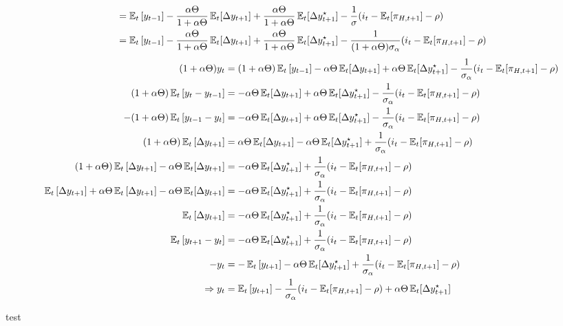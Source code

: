 \documentclass[12pt]{article}
\begin{document}
\begin{landscape}
\begin{align*}
    &= \operatorname{\mathbb{E}}_t\left[y_{t-1}\right] - \frac{\alpha \Theta}{1+\alpha \Theta} \operatorname{\mathbb{E}}_t[\Delta y_{t+1}] + \frac{\alpha \Theta}{1+\alpha \Theta}\operatorname{\mathbb{E}}_t[\Delta y_{t+1}^{\star}] - \frac{1}{\sigma}( i_t  - \operatorname{\mathbb{E}}_t [\pi_{H,t+1}] - \rho  ) \\
    &= \operatorname{\mathbb{E}}_t\left[y_{t-1}\right] - \frac{\alpha \Theta}{1+\alpha \Theta} \operatorname{\mathbb{E}}_t[\Delta y_{t+1}] + \frac{\alpha \Theta}{1+\alpha \Theta}\operatorname{\mathbb{E}}_t[\Delta y_{t+1}^{\star}] - \frac{1}{(1+\alpha \Theta)\sigma_\alpha}( i_t  - \operatorname{\mathbb{E}}_t [\pi_{H,t+1}] - \rho  ) \\
\end{align*}  
\begin{align}  
    (1+\alpha \Theta)y_t&= (1+\alpha \Theta)\operatorname{\mathbb{E}}_t\left[y_{t-1}\right] - \alpha \Theta \operatorname{\mathbb{E}}_t[\Delta y_{t+1}] + \alpha \Theta\operatorname{\mathbb{E}}_t[\Delta y_{t+1}^{\star}] - \frac{1}{\sigma_\alpha}( i_t  - \operatorname{\mathbb{E}}_t [\pi_{H,t+1}] - \rho  ) \nonumber\\
    (1+\alpha \Theta)\operatorname{\mathbb{E}}_t\left[y_t - y_{t-1}\right]&=  - \alpha \Theta \operatorname{\mathbb{E}}_t[\Delta y_{t+1}] + \alpha \Theta\operatorname{\mathbb{E}}_t[\Delta y_{t+1}^{\star}] - \frac{1}{\sigma_\alpha}( i_t  - \operatorname{\mathbb{E}}_t [\pi_{H,t+1}] - \rho  ) \nonumber\\
    -(1+\alpha \Theta)\operatorname{\mathbb{E}}_t\left[y_{t-1} - y_t \right]&=  - \alpha \Theta \operatorname{\mathbb{E}}_t[\Delta y_{t+1}] + \alpha \Theta\operatorname{\mathbb{E}}_t[\Delta y_{t+1}^{\star}] - \frac{1}{\sigma_\alpha}( i_t  - \operatorname{\mathbb{E}}_t [\pi_{H,t+1}] - \rho  ) \nonumber\\
    (1+\alpha \Theta)\operatorname{\mathbb{E}}_t\left[\Delta y_{t+1}\right]&=  \alpha \Theta \operatorname{\mathbb{E}}_t[\Delta y_{t+1}] - \alpha \Theta\operatorname{\mathbb{E}}_t[\Delta y_{t+1}^{\star}] + \frac{1}{\sigma_\alpha}( i_t  - \operatorname{\mathbb{E}}_t [\pi_{H,t+1}] - \rho  ) \nonumber\\
    (1+\alpha \Theta)\operatorname{\mathbb{E}}_t\left[\Delta y_{t+1}\right] - \alpha \Theta \operatorname{\mathbb{E}}_t[\Delta y_{t+1}]&= - \alpha \Theta\operatorname{\mathbb{E}}_t[\Delta y_{t+1}^{\star}] + \frac{1}{\sigma_\alpha}( i_t  - \operatorname{\mathbb{E}}_t [\pi_{H,t+1}] - \rho  ) \nonumber\\
    \operatorname{\mathbb{E}}_t\left[\Delta y_{t+1}\right] +\alpha \Theta\operatorname{\mathbb{E}}_t\left[\Delta y_{t+1}\right] - \alpha \Theta \operatorname{\mathbb{E}}_t[\Delta y_{t+1}]&= - \alpha \Theta\operatorname{\mathbb{E}}_t[\Delta y_{t+1}^{\star}] + \frac{1}{\sigma_\alpha}( i_t  - \operatorname{\mathbb{E}}_t [\pi_{H,t+1}] - \rho  ) \nonumber\\
    \operatorname{\mathbb{E}}_t\left[\Delta y_{t+1}\right] &= - \alpha \Theta\operatorname{\mathbb{E}}_t[\Delta y_{t+1}^{\star}] + \frac{1}{\sigma_\alpha}( i_t  - \operatorname{\mathbb{E}}_t [\pi_{H,t+1}] - \rho  ) \nonumber\\
    \operatorname{\mathbb{E}}_t\left[y_{t+1}-y_t\right] &= - \alpha \Theta\operatorname{\mathbb{E}}_t[\Delta y_{t+1}^{\star}] + \frac{1}{\sigma_\alpha}( i_t  - \operatorname{\mathbb{E}}_t [\pi_{H,t+1}] - \rho  )\nonumber\\
    -y_t &= -\operatorname{\mathbb{E}}_t\left[y_{t+1}\right]- \alpha \Theta\operatorname{\mathbb{E}}_t[\Delta y_{t+1}^{\star}] + \frac{1}{\sigma_\alpha}( i_t  - \operatorname{\mathbb{E}}_t [\pi_{H,t+1}] - \rho  ) \nonumber\\
    \Rightarrow y_t &= \operatorname{\mathbb{E}}_t\left[y_{t+1}\right]- \frac{1}{\sigma_\alpha}( i_t  - \operatorname{\mathbb{E}}_t [\pi_{H,t+1}] - \rho  ) + \alpha \Theta\operatorname{\mathbb{E}}_t[\Delta y_{t+1}^{\star}] \\
\end{align}
\end{landscape}
test
\end{document}
